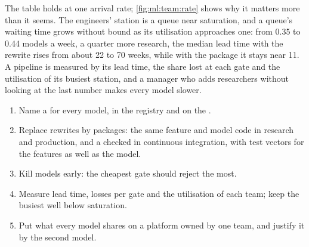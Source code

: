 \begin{omfigure}

\label{fig:ml:team:rate}
\end{omfigure}

The table holds at one arrival rate; \cref{fig:ml:team:rate} shows why it matters more than it seems. The engineers' station is
a queue near saturation, and a queue's waiting time grows without bound as its utilisation approaches one: from 0.35 to 0.44
models a week, a quarter more research, the median lead time with the rewrite rises from about 22 to 70 weeks, while with the
package it stays near 11. A pipeline is measured by its lead time, the share lost at each gate and the utilisation of its busiest
station, and a manager who adds researchers without looking at the last number makes every model slower.

\begin{method}\label{met:ml:team:method}
\begin{enumerate}
\item Name a  for every model, in the registry and on the .
\item Replace rewrites by packages: the same feature and model code in research and production, and a 
checked in continuous integration, with test vectors for the features as well as the model.
\item Kill models early: the cheapest gate should reject the most.
\item Measure lead time, losses per gate and the utilisation of each team; keep the busiest well below saturation.
\item Put what every model shares on a platform owned by one team, and justify it by the second model.
\end{enumerate}
\end{method}


